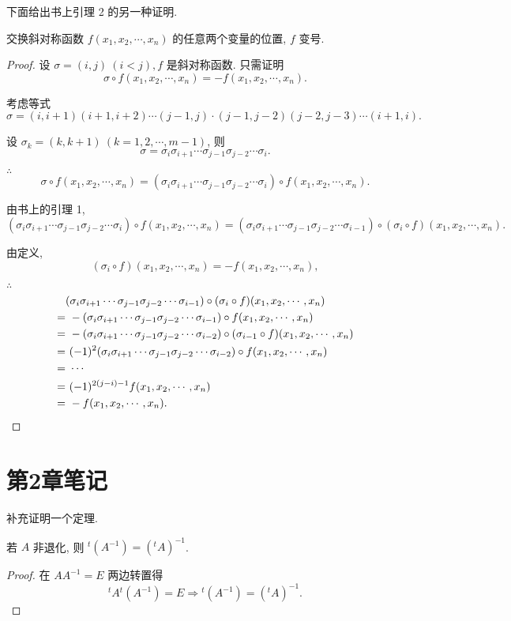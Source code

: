 \documentclass{ctexart}
\begin{document}
下面给出书上引理 2 的另一种证明.
\begin{lemma}[书上的引理 2]
    交换斜对称函数 $f(x_1,x_2,\cdots,x_n)$ 的任意两个变量的位置, $f$ 变号.
\end{lemma}
\begin{proof}
    设 $\sigma=(i,j)\ (i<j),f$ 是斜对称函数. 只需证明
    \[\sigma\circ f(x_1,x_2,\cdots,x_n)=-f(x_1,x_2,\cdots,x_n).\]

    考虑等式
    \[\sigma=(i,i+1)(i+1,i+2)\cdots(j-1,j)\cdot(j-1,j-2)(j-2,j-3)\cdots(i+1,i).\]

    设 $\sigma_k=(k,k+1)\ (k=1,2,\cdots,m-1)$, 则
    \[\sigma=\sigma_i\sigma_{i+1}\cdots\sigma_{j-1}\sigma_{j-2}\cdots\sigma_i.\]

    $\therefore$
    \[\sigma\circ f(x_1,x_2,\cdots,x_n)=(\sigma_i\sigma_{i+1}\cdots\sigma_{j-1}\sigma_{j-2}\cdots\sigma_i)\circ f(x_1,x_2,\cdots,x_n).\]

    由书上的引理 1,
    \[(\sigma_i\sigma_{i+1}\cdots\sigma_{j-1}\sigma_{j-2}\cdots\sigma_i)\circ f(x_1,x_2,\cdots,x_n)=(\sigma_i\sigma_{i+1}\cdots\sigma_{j-1}\sigma_{j-2}\cdots\sigma_{i-1})\circ(\sigma_i\circ f)(x_1,x_2,\cdots,x_n).\]

    由定义,
    \[(\sigma_i\circ f)(x_1,x_2,\cdots,x_n)=-f(x_1,x_2,\cdots,x_n),\]

    $\therefore$
    \begin{align*}
        & (\sigma_i\sigma_{i+1}\cdots\sigma_{j-1}\sigma_{j-2}\cdots\sigma_{i-1})\circ(\sigma_i\circ f)(x_1,x_2,\cdots,x_n)\\
        = & \ -(\sigma_i\sigma_{i+1}\cdots\sigma_{j-1}\sigma_{j-2}\cdots\sigma_{i-1})\circ f(x_1,x_2,\cdots,x_n) \\
        = & \ -(\sigma_i\sigma_{i+1}\cdots\sigma_{j-1}\sigma_{j-2}\cdots\sigma_{i-2})\circ(\sigma_{i-1}\circ f)(x_1,x_2,\cdots,x_n) \\
        = & \ (-1)^2(\sigma_i\sigma_{i+1}\cdots\sigma_{j-1}\sigma_{j-2}\cdots\sigma_{i-2})\circ f(x_1,x_2,\cdots,x_n) \\
        = & \ \cdots \\
        = & \ (-1)^{2(j-i)-1}f(x_1,x_2,\cdots,x_n) \\
        = & \ -f(x_1,x_2,\cdots,x_n).\qedhere
    \end{align*}
\end{proof}
\section{第2章笔记}
补充证明一个定理.
\begin{theorem}
    若 $A$ 非退化, 则 ${}^t(A^{-1})=({}^tA)^{-1}$.
\end{theorem}
\begin{proof}
    在 $AA^{-1}=E$ 两边转置得
    \[{}^tA{}^t(A^{-1})=E\Rightarrow{}^t(A^{-1})=({}^tA)^{-1}.\]
\end{proof}
\end{document}
